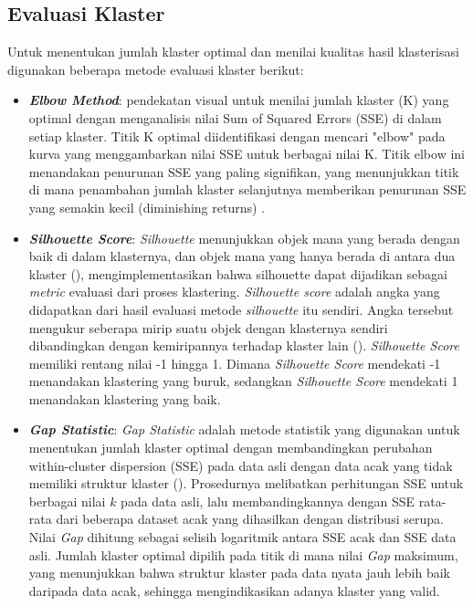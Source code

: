 \subsection{Evaluasi Klaster}
Untuk menentukan jumlah klaster optimal dan menilai kualitas hasil klasterisasi digunakan beberapa metode evaluasi klaster berikut:
\begin{itemize}
	\item \textbf{\textit{Elbow Method}}: pendekatan visual untuk menilai jumlah klaster (K) yang optimal dengan menganalisis nilai Sum of Squared Errors (SSE) di dalam setiap klaster. Titik K optimal diidentifikasi dengan mencari "elbow" pada kurva yang menggambarkan nilai SSE untuk berbagai nilai K. Titik elbow ini menandakan penurunan SSE yang paling signifikan, yang menunjukkan titik di mana penambahan jumlah klaster selanjutnya memberikan penurunan SSE yang semakin kecil (diminishing returns) \parencite{Sugar2003,Umargono2020}.
	\item \textbf{\textit{Silhouette Score}}: \textit{Silhouette} menunjukkan objek mana yang berada dengan baik di dalam klasternya, dan objek mana yang hanya berada di antara dua klaster (\cite{Rousseeuw1987}), mengimplementasikan bahwa silhouette dapat dijadikan sebagai \textit{metric} evaluasi dari proses klastering. \textit{Silhouette score} adalah angka yang didapatkan dari hasil evaluasi metode \textit{silhouette} itu sendiri. Angka tersebut mengukur seberapa mirip suatu objek dengan klasternya sendiri dibandingkan dengan kemiripannya terhadap klaster lain (\cite{Januzaj2023}). \textit{Silhouette Score} memiliki rentang nilai -1 hingga 1. Dimana \textit{Silhouette Score} mendekati -1 menandakan klastering yang buruk, sedangkan \textit{Silhouette Score} mendekati 1 menandakan klastering yang baik.
	\item \textbf{\textit{Gap Statistic}}: \textit{Gap Statistic} adalah metode statistik yang digunakan untuk menentukan jumlah klaster optimal dengan membandingkan perubahan within-cluster dispersion (SSE) pada data asli dengan data acak yang tidak memiliki struktur klaster (\cite{Tibshirani2001}). Prosedurnya melibatkan perhitungan SSE untuk berbagai nilai $k$ pada data asli, lalu membandingkannya dengan SSE rata-rata dari beberapa dataset acak yang dihasilkan dengan distribusi serupa. Nilai \textit{Gap} dihitung sebagai selisih logaritmik antara SSE acak dan SSE data asli. Jumlah klaster optimal dipilih pada titik di mana nilai \textit{Gap} maksimum, yang menunjukkan bahwa struktur klaster pada data nyata jauh lebih baik daripada data acak, sehingga mengindikasikan adanya klaster yang valid.
\end{itemize}

